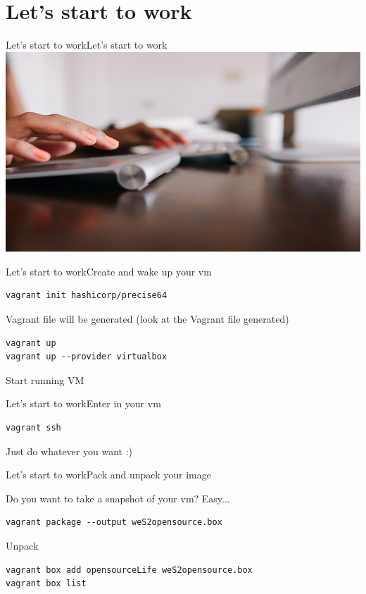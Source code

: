 \documentclass[10pt]{beamer}
\begin{document}
\section{Let's start to work}

\begin{frame}{Let's start to work}{Let's start to work}
  \includegraphics[width=1\textwidth, keepaspectratio=true]{images/work.jpg}
\end{frame}

\begin{frame}[fragile]{Let's start to work}{Create and wake up your vm}
\begin{lstlisting}
vagrant init hashicorp/precise64
\end{lstlisting}

Vagrant file will be generated (look at the Vagrant file generated)
\pause

\begin{lstlisting}
vagrant up
vagrant up --provider virtualbox
\end{lstlisting}
Start running VM

\end{frame}

\begin{frame}[fragile]{Let's start to work}{Enter in your vm}
\begin{lstlisting}
vagrant ssh
\end{lstlisting}
Just do whatever you want :)
\end{frame}

\begin{frame}[fragile]{Let's start to work}{Pack and unpack your image}

Do you want to take a snapshot of your vm? Easy...

\begin{lstlisting}
vagrant package --output weS2opensource.box
\end{lstlisting}

\pause

Unpack

\begin{lstlisting}
vagrant box add opensourceLife weS2opensource.box
vagrant box list
\end{lstlisting}

\end{frame}
\end{document}
